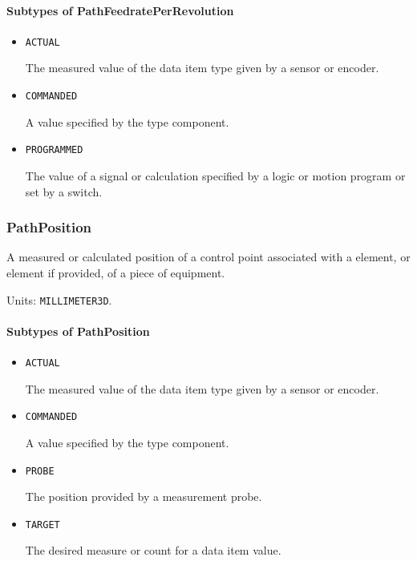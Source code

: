 \paragraph{Subtypes of PathFeedratePerRevolution}\mbox{}
\label{sec:Subtypes of PathFeedratePerRevolution}

\begin{itemize}

\item \texttt{ACTUAL}


The measured value of the data item type given by a sensor or encoder.

\item \texttt{COMMANDED}


A value specified by the  type component.

\item \texttt{PROGRAMMED}


The value of a signal or calculation specified by a logic or motion program or set by a switch.


\end{itemize}

\subsubsection{PathPosition}
\label{sec:PathPosition}



A measured or calculated position of a control point associated with a  element, or  element if provided, of a piece of equipment.


Units: \texttt{MILLIMETER\textunderscore 3D}.

\paragraph{Subtypes of PathPosition}\mbox{}
\label{sec:Subtypes of PathPosition}

\begin{itemize}

\item \texttt{ACTUAL}


The measured value of the data item type given by a sensor or encoder.

\item \texttt{COMMANDED}


A value specified by the  type component.

\item \texttt{PROBE}


The position provided by a measurement probe.

\item \texttt{TARGET}


The desired measure or count for a data item value.


\end{itemize}

